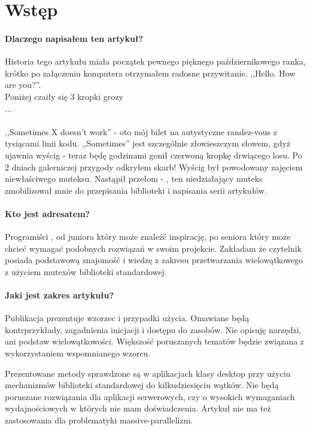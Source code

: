 \section{Wstęp}\label{sec:introduction}
\paragraph{Dlaczego napisałem ten artykuł?}
Historia tego artykułu miała początek pewnego pięknego październikowego ranka, krótko po załączeniu komputera otrzymałem radosne przywitanie. ,,Hello. How are you?''.\\
Poniżej czaiły się 3 kropki grozy\\
...\\
\\
,,Sometimes X doesn't work'' - oto mój bilet na autystyczne randez-vous z tysiącami linii kodu.
,,Sometimes'' jest szczególnie złowieszczym słowem, gdyż ujawnia wyścig - teraz będę  godzinami gonił czerwoną kropkę drwiącego losu. Po 2 dniach galerniczej przygody odkryłem skarb! Wyścig był powodowany zajęciem niewłaściwego muteksu. Nastąpił przełom - , ten niedziałający muteks zmobilizował mnie do przepisania biblioteki i napisania serii artykułów.

\paragraph{Kto jest adresatem?}
Programiści \Cpp{}, od juniora który może znaleźć inspirację, po seniora który może chcieć wymagać podobnych rozwiązań w swoim projekcie. Zakładam że czytelnik posiada podstawową znajomość  i wiedzę z zakresu przetwarzania wielowątkowego z użyciem mutexów biblioteki standardowej.

\paragraph{Jaki jest zakres artykułu?}
Publikacja prezentuje wzorzec  i przypadki użycia. Omawiane będą kontrprzykłady, zagadnienia inicjacji i dostępu do zasobów. Nie opisuję narzędzi, ani podstaw wielowątkowości. Większość poruszanych tematów będzie związana z wykorzystaniem wspomnianego wzorcu.

Prezentowane metody sprawdzone są w aplikacjach klasy desktop przy użyciu mechanizmów biblioteki standardowej do kilkudziesięciu wątków. Nie będą poruszane rozwiązania dla aplikacji serwerowych, czy o wysokich wymaganiach wydajnościowych w których nie mam doświadczenia. Artykuł nie ma też zastosowania dla problematyki massive-parallelizm.

